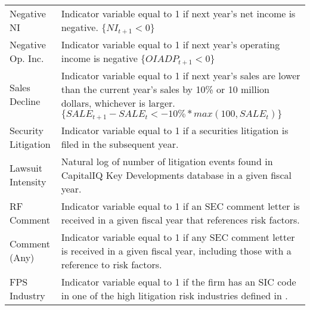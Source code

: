 {\begin{center}
\begin{longtable*}{l  >{\raggedright\let\newline\\\arraybackslash\hspace{0pt}}p{.7 \textwidth}}
		Negative NI 		& Indicator variable equal to 1 if next year's net income is negative. $ \{ NI_{t+1} < 0 \} $\\ %
		Negative Op. Inc. 	& Indicator variable equal to 1 if next year's operating income is negative $ \{ OIADP_{t+1} < 0 \} $ \\ %
		Sales Decline 		& Indicator variable equal to 1 if next year's sales are lower than the current year's sales by 10\%  or 10 million dollars, whichever is larger. $ \{ SALE_{t+1} - SALE_{t} < -10\%*max(100, SALE_{t}) \} $\\ %
		Security Litigation	& Indicator variable equal to 1 if a securities litigation is filed in the subsequent year. \\ %
		Lawsuit Intensity	& Natural log of number of litigation events found in CapitalIQ Key Developments database in a given fiscal year.\\ %
		RF Comment 			& Indicator variable equal to 1 if an SEC comment letter is received in a given fiscal year that references risk factors. \\ %
		Comment (Any) 		& Indicator variable equal to 1 if any SEC comment letter is received in a given fiscal year, including those with a reference to risk factors. \\ %
		FPS Industry		& Indicator variable equal to 1 if the firm has an SIC code in one of the high litigation risk industries defined in \cite{francis_1994}. \\ %
        

\end{longtable*}
\end{center}}
